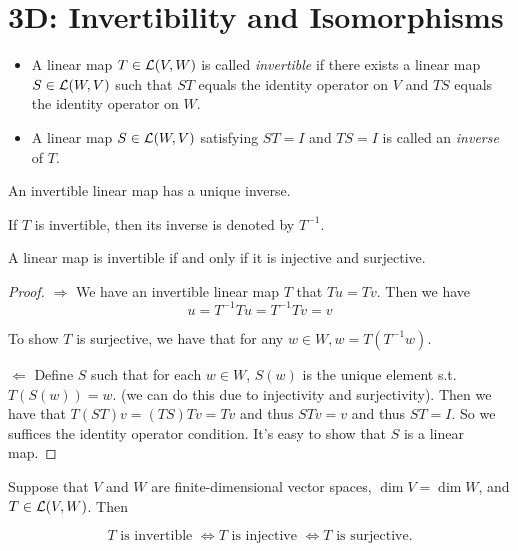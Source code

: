 \documentclass{extarticle}
\begin{document}
\newpage 

\section*{3D: Invertibility and Isomorphisms}

\begin{definition}
    \begin{itemize}
        \item A linear map \(T \in \mathcal{L}(V, W)\) is called \emph{invertible} if there exists a linear map 
        \(S \in \mathcal{L}(W, V)\) such that \(ST\) equals the identity operator on \(V\) and \(TS\) equals 
        the identity operator on \(W\). 
        \item A linear map \(S \in \mathcal{L}(W, V)\) satisfying \(ST = I\) and \(TS = I\) is called an 
        \emph{inverse} of \(T\). 
    \end{itemize}
\end{definition}

\begin{thm}
    An invertible linear map has a unique inverse. 
\end{thm}

If \(T\) is invertible, then its inverse is denoted by \(T^{-1}\). 

\begin{thm}
    A linear map is invertible if and only if it is injective and surjective. 
\end{thm}

\begin{proof}
\(\Rightarrow\) We have an invertible linear map \(T\) that \(T u = T v\). Then we have 
\[u = T^{-1} Tu = T^{-1} Tv = v\]

To show \(T\) is surjective, we have that for any \(w \in W, w = T(T^{-1}w)\). 

\(\Leftarrow\) Define \(S\) such that for each \(w \in W\), \(S(w)\) is the unique element 
s.t. \(T(S(w)) = w\). (we can do this due to injectivity and surjectivity). Then we have that 
\(T(ST)v = (TS)Tv = Tv\) and thus \(ST v = v\) and thus \(ST = I\). So we suffices the identity 
operator condition. It's easy to show that \(S\) is a linear map.
\end{proof}

\begin{thm}
    Suppose that \(V\) and \(W\) are finite-dimensional vector spaces, \(\dim V = \dim W\), 
    and \(T \in \mathcal{L}(V, W)\). Then 

    \[T \text{ is invertible } \Longleftrightarrow T \text{ is injective } \Longleftrightarrow T \text{ is surjective.}\]
\end{thm}
\end{document}
